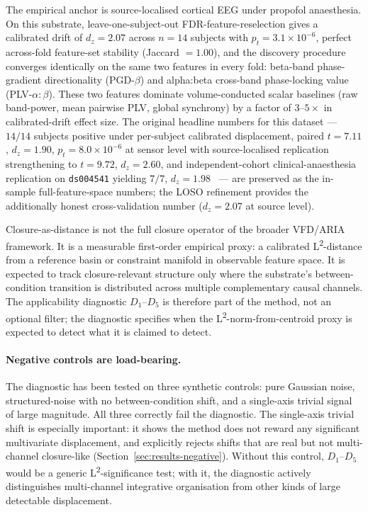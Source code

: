 \documentclass[11pt,a4paper]{article}
\begin{document}
The empirical anchor is source-localised cortical EEG under propofol anaesthesia. On this substrate, leave-one-subject-out FDR-feature-reselection gives a calibrated drift of $d_z = 2.07$ across $n = 14$ subjects with $p_t = 3.1 \times 10^{-6}$, perfect across-fold feature-set stability (Jaccard $= 1.00$), and the discovery procedure converges identically on the same two features in every fold: beta-band phase-gradient directionality (PGD-$\beta$) and alpha:beta cross-band phase-locking value (PLV-$\alpha{:}\beta$). These two features dominate volume-conducted scalar baselines (raw band-power, mean pairwise PLV, global synchrony) by a factor of $3$--$5\times$ in calibrated-drift effect size. The original headline numbers for this dataset --- $14/14$ subjects positive under per-subject calibrated displacement, paired $t = 7.11$, $d_z = 1.90$, $p_t = 8.0 \times 10^{-6}$ at sensor level with source-localised replication strengthening to $t = 9.72$, $d_z = 2.60$, and independent-cohort clinical-anaesthesia replication on \texttt{ds004541} yielding $7/7$, $d_z = 1.98$~\citep{SolutionLab002} --- are preserved as the in-sample full-feature-space numbers; the LOSO refinement provides the additionally honest cross-validation number ($d_z = 2.07$ at source level).

Closure-as-distance is not the full closure operator of the broader VFD/ARIA framework. It is a measurable first-order empirical proxy: a calibrated L\textsuperscript{2}-distance from a reference basin or constraint manifold in observable feature space. It is expected to track closure-relevant structure only where the substrate's between-condition transition is distributed across multiple complementary causal channels. The applicability diagnostic $D_1$--$D_5$ is therefore part of the method, not an optional filter; the diagnostic specifies when the L\textsuperscript{2}-norm-from-centroid proxy is expected to detect what it is claimed to detect.

\paragraph{Negative controls are load-bearing.} The diagnostic has been tested on three synthetic controls: pure Gaussian noise, structured-noise with no between-condition shift, and a single-axis trivial signal of large magnitude. All three correctly fail the diagnostic. The single-axis trivial shift is especially important: it shows the method does not reward any significant multivariate displacement, and explicitly rejects shifts that are real but not multi-channel closure-like (Section~\ref{sec:results-negative}). Without this control, $D_1$--$D_5$ would be a generic L\textsuperscript{2}-significance test; with it, the diagnostic actively distinguishes multi-channel integrative organisation from other kinds of large detectable displacement.
\end{document}
